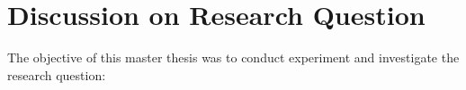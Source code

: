 \documentclass[%
	BCOR=8mm, %
	DIV=12,
	toc=bibliography, %
	toc=listof, %
	oneside, %
	egregdoesnotlikesansseriftitles, %
	]{scrbook}
\begin{document}

\newpage
\section{Discussion on Research Question}
The objective of this master thesis was to conduct experiment and investigate the research question: \\
\end{document}

